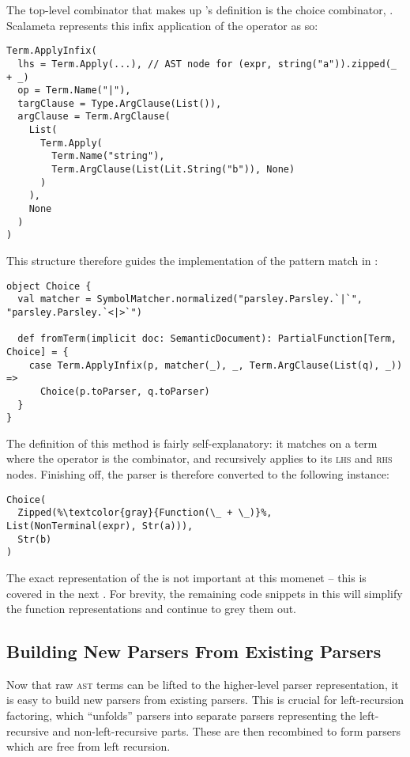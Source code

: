 \documentclass[../../../main.tex]{subfiles}
\begin{document}
The top-level combinator that makes up 's definition is the choice combinator, \scala{|}.
Scalameta represents this infix application of the \scala{|} operator as so:
\begin{verbatim}
Term.ApplyInfix(
  lhs = Term.Apply(...), // AST node for (expr, string("a")).zipped(_ + _)
  op = Term.Name("|"),
  targClause = Type.ArgClause(List()),
  argClause = Term.ArgClause(
    List(
      Term.Apply(
        Term.Name("string"),
        Term.ArgClause(List(Lit.String("b")), None)
      )
    ),
    None
  )
)
\end{verbatim}
%
This structure therefore guides the implementation of the pattern match in :
\begin{verbatim}
object Choice {
  val matcher = SymbolMatcher.normalized("parsley.Parsley.`|`", "parsley.Parsley.`<|>`")

  def fromTerm(implicit doc: SemanticDocument): PartialFunction[Term, Choice] = {
    case Term.ApplyInfix(p, matcher(_), _, Term.ArgClause(List(q), _)) =>
      Choice(p.toParser, q.toParser)
  }
}
\end{verbatim}
%
The definition of this method is fairly self-explanatory: it matches on a  term where the operator is the \scala{|} combinator, and recursively applies  to its \textsc{lhs} and \textsc{rhs} nodes.
Finishing off, the  parser is therefore converted to the following  instance:
\begin{verbatim}
Choice(
  Zipped(%\textcolor{gray}{Function(\_ + \_)}%, List(NonTerminal(expr), Str(a))),
  Str(b)
)
\end{verbatim}
The exact representation of the  is not important at this momenet -- this is covered in the next .
For brevity, the remaining code snippets in this  will simplify the function representations and continue to grey them out.

\subsection{Building New Parsers From Existing Parsers}
Now that raw \textsc{ast} terms can be lifted to the higher-level parser representation, it is easy to build new parsers from existing parsers.
This is crucial for left-recursion factoring, which ``unfolds'' parsers into separate parsers representing the left-recursive and non-left-recursive parts.
These are then recombined to form parsers which are free from left recursion.
\end{document}
